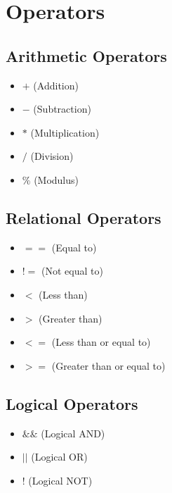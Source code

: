 \documentclass{report}
\begin{document}
    \section{\LARGE Operators}
    \bigbreak \noindent 
    \begin{minipage}[t]{0.47\textwidth}
        \subsection{Arithmetic Operators}
        \begin{itemize}
          \item \( + \) (Addition)
          \item \( - \) (Subtraction)
          \item \( * \) (Multiplication)
          \item \( / \) (Division)
          \item \( \% \) (Modulus)
        \end{itemize}
    \end{minipage}
    \begin{minipage}[t]{0.47\textwidth}
     \subsection{Relational Operators}
    \begin{itemize}
      \item \( == \) (Equal to)
      \item \( != \) (Not equal to)
      \item \( < \) (Less than)
      \item \( > \) (Greater than)
      \item \( <= \) (Less than or equal to)
      \item \( >= \) (Greater than or equal to)
    \end{itemize}
    \end{minipage}
    \bigbreak \noindent 
    \begin{minipage}[t]{0.47\textwidth}
    \subsection{Logical Operators}
    \begin{itemize}
      \item \( \&\& \) (Logical AND)
      \item \( || \) (Logical OR)
      \item \( ! \) (Logical NOT)
    \end{itemize}
    \end{minipage}
\end{document}

